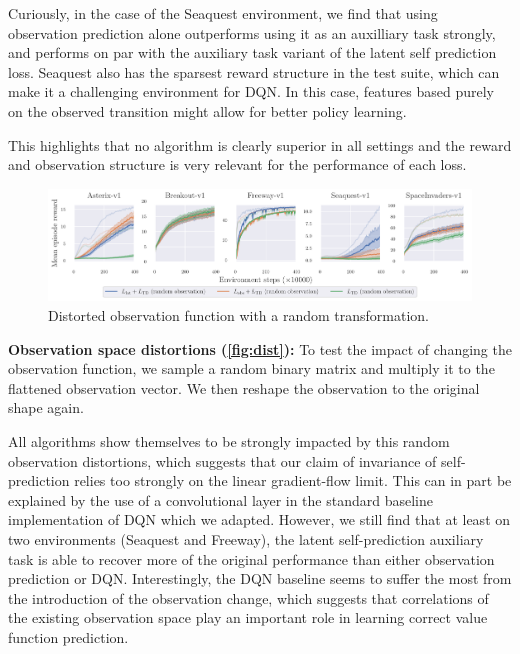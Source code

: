 Curiously, in the case of the Seaquest environment, we find that using observation prediction alone outperforms using it as an auxilliary task strongly, and performs on par with the auxiliary task variant of the latent self prediction loss.
Seaquest also has the sparsest reward structure in the test suite, which can make it a challenging environment for DQN. In this case, features based purely on the observed transition might allow for better policy learning.

This highlights that no algorithm is clearly superior in all settings and the reward and observation structure is very relevant for the performance of each loss.


\begin{figure}[t]
    \centering
    \includegraphics[width=\textwidth]{figures/understanding/rlc2024-distorted-fixed_minatar.pdf}
    \caption{Distorted observation function with a random transformation.}
    \label{fig:dist}
\end{figure}

\textbf{Observation space distortions (\autoref{fig:dist}):} To test the impact of changing the observation function, we sample a random binary matrix and multiply it to the flattened observation vector. We then reshape the observation to the original shape again.

All algorithms show themselves to be strongly impacted by this random observation distortions, which suggests that our claim of invariance of self-prediction relies too strongly on the linear gradient-flow limit.
This can in part be explained by the use of a convolutional layer in the standard baseline implementation of DQN which we adapted.
However, we still find that at least on two environments (Seaquest and Freeway), the latent self-prediction auxiliary task is able to recover more of the original performance than either observation prediction or DQN.
Interestingly, the DQN baseline seems to suffer the most from the introduction of the observation change, which suggests that correlations of the existing observation space play an important role in learning correct value function prediction.

